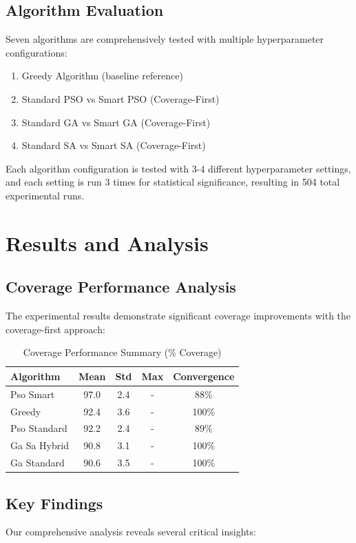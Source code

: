 \documentclass[conference]{IEEEtran}
\begin{document}
\subsection{Algorithm Evaluation}
Seven algorithms are comprehensively tested with multiple hyperparameter configurations:

\begin{enumerate}
\item Greedy Algorithm (baseline reference)
\item Standard PSO vs Smart PSO (Coverage-First)
\item Standard GA vs Smart GA (Coverage-First)  
\item Standard SA vs Smart SA (Coverage-First)
\end{enumerate}

Each algorithm configuration is tested with 3-4 different hyperparameter settings, and each setting is run 3 times for statistical significance, resulting in 504 total experimental runs.

\section{Results and Analysis}

\subsection{Coverage Performance Analysis}
The experimental results demonstrate significant coverage improvements with the coverage-first approach:

\begin{table}[h]
\centering
\caption{Coverage Performance Summary (\% Coverage)}
\begin{tabular}{lcccc}
\toprule
Algorithm & Mean & Std & Max & Convergence \\
\midrule
Pso Smart & 97.0 & 2.4 & - & 88\% \\
Greedy & 92.4 & 3.6 & - & 100\% \\
Pso Standard & 92.2 & 2.4 & - & 89\% \\
Ga Sa Hybrid & 90.8 & 3.1 & - & 100\% \\
Ga Standard & 90.6 & 3.5 & - & 100\% \\
\bottomrule
\end{tabular}
\end{table}

\subsection{Key Findings}
Our comprehensive analysis reveals several critical insights:
\end{document}

